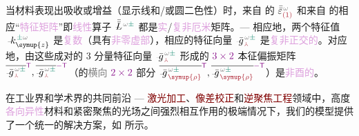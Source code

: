 当材料表现出\textcolor{NavyBlue}{吸收}或\textcolor{NavyBlue}{增益}（显示\textcolor{NavyBlue}{线}和/或\textcolor{NavyBlue}{圆二色性}）时，来自  的 $\bar{\bar{\varepsilon}}^{\;\! \mathcolor{gray}{\omega}}_{\textcolor{Maroon}{(1)}}$ 和来自  的相应“\textcolor{Plum}{特征矩阵}”即\textcolor{Plum}{线性}算子 $\xint{\mathcolor{gray}{-}}{30}{\bar{\bar{L}}}^{\;\! \mathcolor{gray}{\omega} \textcolor{PineGreen}{\pm}}$ 都是\textcolor{Plum}{实}/\textcolor{Plum}{复非厄米}矩阵。--- 相应地，两个\textcolor{PineGreen}{特征值} $\xint{\begin{smallmatrix} ~ \\ {}^{}_{\mathcolor{gray}{-}} \\ ~ \end{smallmatrix}}{15}{k}_{\symup{z} }^{\;\! \textcolor{PineGreen}{\pm} \mathcolor{gray}{\omega}}$ 是\textcolor{Plum}{复数}（具有\textcolor{Plum}{非零虚部}），相应的\textcolor{PineGreen}{特征向量} $\xint{{}^{}_{\mathcolor{gray}{-}}}{10}{\bar{g}}^{\;\!\mathcolor{gray}{\omega} \textcolor{PineGreen}{\pm}}_{\;\! \textcolor{Maroon}{\Yup}}$ 是\textcolor{Plum}{复非正交的}。对应地，由这些成对的 3 分量\textcolor{PineGreen}{特征向量} $\xint{{}^{}_{\mathcolor{gray}{-}}}{10}{\bar{g}}^{\;\!\mathcolor{gray}{\omega} \textcolor{PineGreen}{\pm}}_{\;\! \textcolor{Maroon}{\Yup}}$ 形成的 $\textcolor{Plum}{3 \times 2}$ \textcolor{PineGreen}{本征偏振矩阵} $\overline{\xint{{}^{}_{\mathcolor{gray}{-}}}{10}{\bar{g}}^{\;\!\mathcolor{gray}{\omega} \textcolor{PineGreen}{\pm}}_{\;\! \textcolor{Maroon}{\Yup}}}^{\mathsf{\textcolor{Plum}{T}}}, \overline{\xint{{}^{}_{\mathcolor{gray}{-}}}{10}{\bar{g}}^{\;\!\mathcolor{gray}{\omega} \textcolor{PineGreen}{\pm}}_{\;\! \textcolor{Maroon}{\Yup}}}^{\textcolor{Plum}{-\mathsf{T}}}$（的\textcolor{gray}{横向} $\textcolor{Plum}{2 \times 2}$ 部分 $\overline{\xint{{}^{}_{\mathcolor{gray}{-}}}{10}{\bar{g}}^{\;\!\mathcolor{gray}{\omega} \textcolor{PineGreen}{\pm}}_{\;\! \textcolor{Maroon}{\symup{\rho}}}}^{\mathsf{\textcolor{Plum}{T}}}, \overline{\xint{{}^{}_{\mathcolor{gray}{-}}}{10}{\bar{g}}^{\;\!\mathcolor{gray}{\omega} \textcolor{PineGreen}{\pm}}_{\;\! \textcolor{Maroon}{\symup{\rho}}}}^{\textcolor{Plum}{-\mathsf{T}}}$）是\textcolor{Plum}{非酉的}。

在工业界和学术界的共同前沿 --- \textcolor{Maroon}{激光加工}、\textcolor{Maroon}{像差校正}和\textcolor{Maroon}{逆聚焦工程}领域中，高度\textcolor{Plum}{各向异性}材料和\textcolor{PineGreen}{紧密聚焦}的光场之间强烈相互作用的极端情况下，我们的模型提供了一个统一的解决方案，如  所示。

